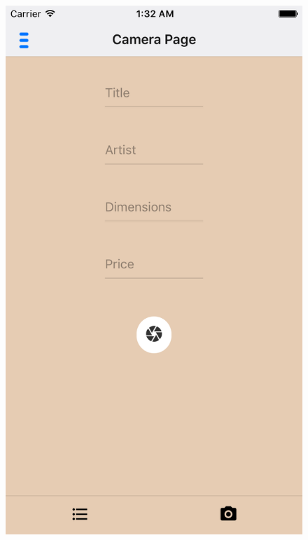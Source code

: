 \begin{figure}[H]
\begin{minipage}[b]{0.285\linewidth}
    \includegraphics[width=\linewidth]{Appendix/VerticalPrototype/attributes.png}
  \end{minipage}
\end{figure}